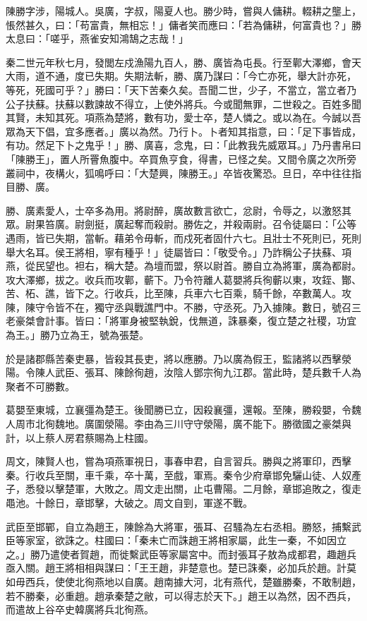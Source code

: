 
\begin{pinyinscope}
陳勝字涉，陽城人。吳廣，字叔，陽夏人也。勝少時，嘗與人傭耕。輟耕之壟上，悵然甚久，曰：「苟富貴，無相忘！」傭者笑而應曰：「若為傭耕，何富貴也？」勝太息曰：「嗟乎，燕雀安知鴻鵠之志哉！」

秦二世元年秋七月，發閭左戍漁陽九百人，勝、廣皆為屯長。行至鄿大澤鄉，會天大雨，道不通，度已失期。失期法斬，勝、廣乃謀曰：「今亡亦死，舉大計亦死，等死，死國可乎？」勝曰：「天下苦秦久矣。吾聞二世，少子，不當立，當立者乃公子扶蘇。扶蘇以數諫故不得立，上使外將兵。今或聞無罪，二世殺之。百姓多聞其賢，未知其死。項燕為楚將，數有功，愛士卒，楚人憐之。或以為在。今誠以吾眾為天下倡，宜多應者。」廣以為然。乃行卜。卜者知其指意，曰：「足下事皆成，有功。然足下卜之鬼乎！」勝、廣喜，念鬼，曰：「此教我先威眾耳。」乃丹書帛曰「陳勝王」，置人所罾魚腹中。卒買魚亨食，得書，已怪之矣。又間令廣之次所旁叢祠中，夜構火，狐鳴呼曰：「大楚興，陳勝王。」卒皆夜驚恐。旦日，卒中往往指目勝、廣。

勝、廣素愛人，士卒多為用。將尉醉，廣故數言欲亡，忿尉，令辱之，以激怒其眾。尉果笞廣。尉劍挺，廣起奪而殺尉。勝佐之，并殺兩尉。召令徒屬曰：「公等遇雨，皆已失期，當斬。藉弟令毋斬，而戍死者固什六七。且壯士不死則已，死則舉大名耳。侯王將相，寧有種乎！」徒屬皆曰：「敬受令。」乃詐稱公子扶蘇、項燕，從民望也。袒右，稱大楚。為壇而盟，祭以尉首。勝自立為將軍，廣為都尉。攻大澤鄉，拔之。收兵而攻鄿，蘄下。乃令符離人葛嬰將兵徇蘄以東，攻銍、酇、苦、柘、譙，皆下之。行收兵，比至陳，兵車六七百乘，騎千餘，卒數萬人。攻陳，陳守令皆不在，獨守丞與戰譙門中。不勝，守丞死。乃入據陳。數日，號召三老豪桀會計事。皆曰：「將軍身被堅執銳，伐無道，誅暴秦，復立楚之社稷，功宜為王。」勝乃立為王，號為張楚。

於是諸郡縣苦秦吏暴，皆殺其長吏，將以應勝。乃以廣為假王，監諸將以西擊滎陽。令陳人武臣、張耳、陳餘徇趙，汝陰人鄧宗徇九江郡。當此時，楚兵數千人為聚者不可勝數。

葛嬰至東城，立襄彊為楚王。後聞勝已立，因殺襄彊，還報。至陳，勝殺嬰，令魏人周市北徇魏地。廣圍滎陽。李由為三川守守滎陽，廣不能下。勝徵國之豪桀與計，以上蔡人房君蔡賜為上柱國。

周文，陳賢人也，嘗為項燕軍視日，事春申君，自言習兵。勝與之將軍印，西擊秦。行收兵至關，車千乘，卒十萬，至戲，軍焉。秦令少府章邯免驪山徒、人奴產子，悉發以擊楚軍，大敗之。周文走出關，止屯曹陽。二月餘，章邯追敗之，復走黽池。十餘日，章邯擊，大破之。周文自剄，軍遂不戰。

武臣至邯鄲，自立為趙王，陳餘為大將軍，張耳、召騷為左右丞相。勝怒，捕繫武臣等家室，欲誅之。柱國曰：「秦未亡而誅趙王將相家屬，此生一秦，不如因立之。」勝乃遣使者賀趙，而徙繫武臣等家屬宮中。而封張耳子敖為成都君，趣趙兵亟入關。趙王將相相與謀曰：「王王趙，非楚意也。楚已誅秦，必加兵於趙。計莫如毋西兵，使使北徇燕地以自廣。趙南據大河，北有燕代，楚雖勝秦，不敢制趙，若不勝秦，必重趙。趙承秦楚之敝，可以得志於天下。」趙王以為然，因不西兵，而遣故上谷卒史韓廣將兵北徇燕。


\end{pinyinscope}
